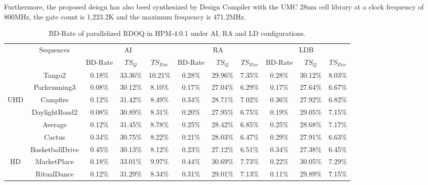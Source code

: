 \documentclass[lettersize,journal]{IEEEtran}
\begin{document}
Furthermore, the proposed deisgn has also beed synthesized by Design Compiler with the UMC 28nm cell library at a clock frequency of 800MHz, the gate count is 1,223.2K and the maximum frequency is 471.2MHz.


\begin{table}[!h]
	\caption{BD-Rate of parallelized RDOQ in HPM-4.0.1 under AI, RA and LD configurations.}
    \label{tab:BD-Rate}
	\centering
	\tabcolsep 8pt  %
	\arrayrulewidth 0.75pt
	\begin{tabular}{c | c | c   c   c | c   c   c | c   c   c } 
		\midrule[0.75pt] \specialrule{0em}{0.35pt}{0.35pt} \midrule[0.75pt] %
		\multirow{2}{*}{Class} & \multirow{2}{*}{Sequences} & \multicolumn{3}{c|}{AI} & \multicolumn{3}{c|}{RA} & \multicolumn{3}{c}{LDB} \\ 
		\cmidrule[0.75pt]{3-11} 
		       &                & BD-Rate & $TS_{Q}$ & $TS_{Enc}$ & BD-Rate & $TS_{Q}$ & $TS_{Enc}$ & BD-Rate & $ TS_{Q}$ & $TS_{Enc}$  \\   
		\cmidrule[0.75pt]{1-11}  
		       & Tango2         & 0.18\% & 33.36\% &10.21\% & 0.28\% & 29.96\% & 7.35\% & 0.28\% & 30.12\% & 8.03\% \\ 
		       & Parkrunning3   & 0.08\% & 30.12\% & 8.10\% & 0.17\% & 27.04\% & 6.29\% & 0.17\% & 27.64\% & 6.67\% \\  
		   UHD & Campfire       & 0.12\% & 31.42\% & 8.49\% & 0.34\% & 28.71\% & 7.02\% & 0.36\% & 27.92\% & 6.82\% \\           
	           & DaylightRoad2  & 0.08\% & 30.89\% & 8.31\% & 0.20\% & 27.95\% & 6.75\% & 0.19\% & 29.05\% & 7.15\% \\   
	    \cmidrule[0.75pt]{2-11} 
	           & Average        & 0.12\% & 31.45\% & 8.78\% & 0.25\% & 28.42\% & 6.85\% & 0.25\% & 28.68\% & 7.17\% \\ 
	    \cmidrule[0.75pt]{1-11}  
	           & Cactus         & 0.34\% & 30.75\% & 8.22\% & 0.21\% & 28.03\% & 6.47\% & 0.29\% & 27.91\% & 6.63\% \\          
	           & BasketballDrive& 0.45\% & 30.13\% & 8.12\% & 0.23\% & 27.12\% & 6.51\% & 0.34\% & 27.38\% & 6.45\% \\  
	      HD   & MarketPlace    & 0.18\% & 33.01\% & 9.97\% & 0.44\% & 30.69\% & 7.73\% & 0.22\% & 30.05\% & 7.29\% \\                    
	           & RitualDance    & 0.12\% & 31.29\% & 8.34\% & 0.31\% & 29.01\% & 7.13\% & 0.11\% & 29.89\% & 7.15\% \\   
	    \cmidrule[0.75pt]{2-11} 

\end{tabular}
\end{table}
\end{document}
